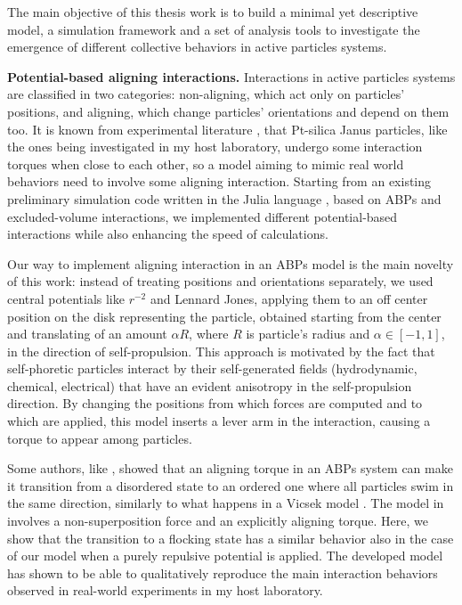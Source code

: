\documentclass[a4paper, notitlepage]{report} %
\begin{document}
	The main objective of this thesis work is to build a minimal yet descriptive model, a simulation framework and a set of analysis tools to investigate the emergence of different collective behaviors in active particles systems.
	
	\textbf{Potential-based aligning interactions.}
	Interactions in active particles systems are classified in two categories: non-aligning, which act only on particles' positions, and aligning, which change particles' orientations and depend on them too.
	It is known from experimental literature \cite{singh_pair_2024}, that Pt-silica Janus particles, like the ones being investigated in my host laboratory, undergo some interaction torques when close to each other, so a model aiming to mimic real world behaviors need to involve some aligning interaction.
	Starting from an existing preliminary simulation code written in the Julia language \cite{julia}, based on ABPs and excluded-volume interactions, we implemented different potential-based interactions while also enhancing the speed of calculations.
	
	Our way to implement aligning interaction in an ABPs model is the main novelty of this work: instead of treating positions and orientations separately, we used central potentials like $r^{-2}$ and Lennard Jones, applying them to an off center position on the disk representing the particle, obtained starting from the center and translating of an amount $\alpha R$, where $R$ is particle's radius and $\alpha \in [-1,1]$, in the direction of self-propulsion.
	This approach is motivated by the fact that self-phoretic particles interact by their self-generated fields (hydrodynamic, chemical, electrical) that have an evident anisotropy in the self-propulsion direction.
	By changing the positions from which forces are computed and to which are applied, this model inserts a lever arm in the interaction, causing a torque to appear among particles.
	
	Some authors, like \citeauthor{martin-gomez_collective_2018}, showed that an aligning torque in an ABPs system can make it transition from a disordered state to an ordered one where all particles swim in the same direction, similarly to what happens in a Vicsek model \cite{vicsek_novel_1995}.
	The model in \cite{martin-gomez_collective_2018} involves a non-superposition force and an explicitly aligning torque.
	Here, we show that the transition to a flocking state has a similar behavior also in the case of our model when a purely repulsive potential is applied.
	The developed model has shown to be able to qualitatively reproduce the main interaction behaviors observed in real-world experiments in my host laboratory.
	
\end{document}
